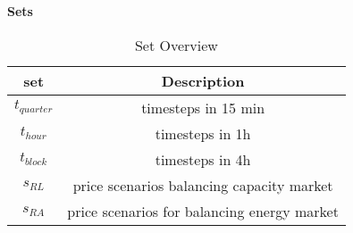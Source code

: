 \textbf{Sets}
\begin{table}[!h]
	\begin{tabular}{c|c}
		\textbf{set}  & \textbf{Description}                        \\
		\hline
		$t_{quarter}$ & timesteps in 15 min                         \\
		$t_{hour}$    & timesteps in 1h                             \\
		$t_{block}$   & timesteps in 4h                             \\
		$s_{RL}$      & price scenarios balancing capacity market   \\
		$s_{RA}$      & price scenarios for balancing energy market \\
	\end{tabular}
	\caption{Set Overview}
	\label{tab:Set_Overview}
\end{table}\\

